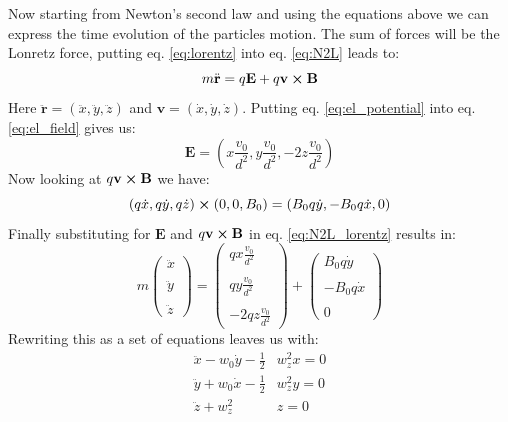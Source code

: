\documentclass[english,notitlepage,reprint,nofootinbib]{revtex4-1}  %
\begin{document}
Now starting from Newton's second law and using the equations above we can express the time evolution of the particles motion.
The sum of forces will be the Lonretz force, putting eq. \ref*{eq:lorentz} into eq. \ref*{eq:N2L} leads to:
\begin{equation}\label{eq:N2L_lorentz}
    m \ddot{\textbf{r}} = q\textbf{E} + q \textbf{v} \cross \textbf{B}
\end{equation}
Here $\ddot{\textbf{r}} = (\ddot{x},\ddot{y},\ddot{z})$ and $\textbf{v} = (\dot{x},\dot{y},\dot{z})$. Putting eq. \ref*{eq:el_potential} into eq. \ref*{eq:el_field} gives us:
\begin{equation}\label{eq:el_calculated}
    \textbf{E} = \left( x \frac{v_0}{d^2}, y \frac{v_0}{d^2}, -2z \frac{v_0}{d^2} \right)
\end{equation}
Now looking at $q \textbf{v} \cross \textbf{B}$ we have:
\begin{equation}\label{eq:cross_calculated}
    (q \dot{x},q \dot{y},q \dot{z}) \cross (0, 0, B_0) = (B_0 q \dot{y}, -B_0 q \dot{x}, 0)
\end{equation}
Finally substituting for $\textbf{E}$ and $q \textbf{v} \cross \textbf{B}$ in eq. \ref*{eq:N2L_lorentz} results in:
\begin{equation*}
    m \begin{pmatrix}
        \ddot{x} \\ \\ \ddot{y} \\ \\ \ddot{z}
    \end{pmatrix}
    = \begin{pmatrix}
        q x \frac{v_0}{d^2} \\ \\ q y \frac{v_0}{d^2} \\ \\ -2 q z \frac{v_0}{d^2}
    \end{pmatrix}
    + \begin{pmatrix}
        B_0 q \dot{y} \\ \\ -B_0 q \dot{x} \\ \\ 0
    \end{pmatrix}
\end{equation*}
Rewriting this as a set of equations leaves us with:
\begin{align}
    \ddot{x} - w_0 \dot{y} - \frac{1}{2}& w_z^2 x = 0 \label{eq:a_x}\\
    \ddot{y} + w_0 \dot{x} - \frac{1}{2}& w_z^2 y = 0 \label{eq:a_y}\\
    \ddot{z} + w_z^2& z = 0 \label{eq:a_z}
\end{align}
\end{document}
